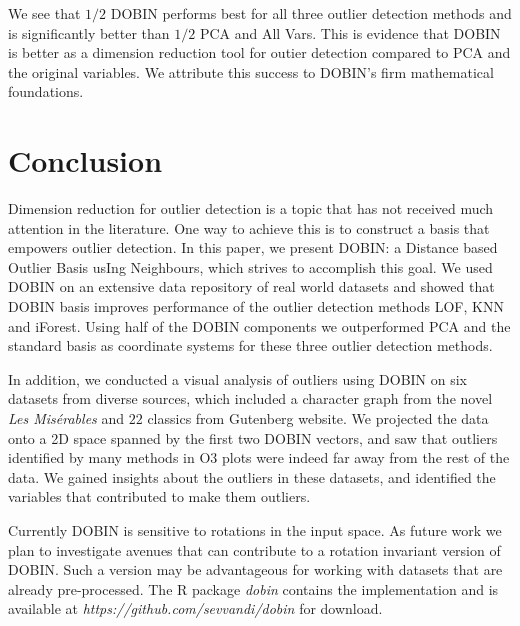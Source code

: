 \documentclass[a4paper,11pt]{article}
\begin{document}
We see that $1/2$ DOBIN performs best for all three outlier detection methods and is significantly better than $1/2$ PCA and All Vars. This is evidence that DOBIN is better as a dimension reduction tool for outier detection compared to PCA and the original variables. We attribute this success to DOBIN's firm mathematical foundations.

\section{Conclusion}
Dimension reduction for outlier detection is a topic that has not received much attention in the literature. One way to achieve this is to construct a basis that empowers outlier detection. In this paper, we present DOBIN: a Distance based Outlier Basis usIng Neighbours, which strives to accomplish this goal. We used DOBIN on an extensive data repository of real world datasets and showed that DOBIN basis improves performance of the outlier detection methods LOF, KNN and iForest. Using half of the DOBIN components we outperformed PCA and the standard basis as coordinate systems for these three outlier detection methods.

In addition, we conducted a visual analysis of outliers using DOBIN on six datasets from diverse sources, which included a character graph from the novel  \textit{Les Mis\'erables} and $22$ classics from Gutenberg website. We projected the data onto a 2D space spanned by the first two DOBIN vectors, and saw that outliers identified by many methods in O3 plots were indeed far away from the rest of the data.  We gained insights about the outliers in these datasets, and identified the variables that contributed to make them outliers.

Currently DOBIN is sensitive to rotations in the input space. As future work we plan to investigate avenues that can contribute to a rotation invariant version of DOBIN. Such a version may be advantageous for working with datasets that are already pre-processed. The R package \textit{dobin} contains the implementation and is available at \textit{https://github.com/sevvandi/dobin} for download.


\end{document}
